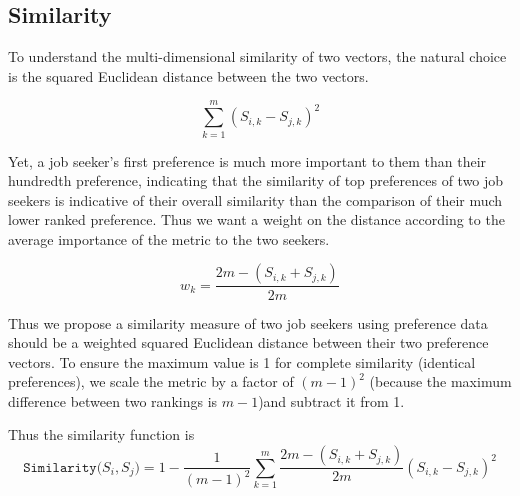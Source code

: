 \subsection{Similarity}

To understand the multi-dimensional similarity of two vectors, the natural choice is the squared Euclidean distance between the two vectors. 

\[\sum_{k=1}^{m} (S_{i,k} - S_{j,k})^2\]

Yet, a job seeker's first preference is much more important to them than their hundredth preference, indicating that the similarity of top preferences of two job seekers is indicative of their overall similarity than the comparison of their much lower ranked preference.  Thus we want a weight on the distance according to the average importance of the metric to the two seekers.

\[w_k = \frac{2m - (S_{i,k} + S_{j,k})}{2m}\]


Thus we propose a similarity measure of two job seekers using preference data should be a weighted squared Euclidean distance between their two preference vectors. To ensure the maximum value is 1 for complete similarity (identical preferences), we scale the metric by a factor of $(m-1)^2$ (because the maximum difference between two rankings is $m-1$)and subtract it from 1.

Thus the similarity function is
\[\texttt{Similarity}({S_i, S_j)} = 1 - \frac{1}{(m-1)^2}\sum_{k=1}^{m} \frac{2m - (S_{i,k} + S_{j,k})}{2m}(S_{i,k} - S_{j,k})^2\]